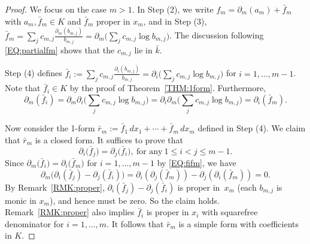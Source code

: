 \documentclass{amsart}
\theoremstyle{definition}
\numberwithin{equation}{section}
\numberwithin{thm}{section}
\begin{document}
\begin{proof} We focus on the case $m > 1$.  In Step (2), we write $f_m = \partial_m(a_m) + \bar f_m$ with $a_m, \bar{f}_m \in K$ and $\bar{f}_m$  proper in $x_m$, and in Step (3), $\bar{f}_m = \sum_j c_{m, j} \frac{\partial_m(b_{m, j})}{b_{m,j}} = \partial_m\big(\sum_j c_{m, j} \log b_{m, j}\big)$.
The discussion following \eqref{EQ:partialfm} shows that the $c_{m,j}$ lie in $\bar k$.  

Step (4) defines $\bar f_i := \sum_j c_{m, j} \frac{\partial_i(b_{m, j})}{b_{m,j}} = \partial_i\big(\sum_j c_{m, j} \log b_{m, j}\big)$ for $i = 1,\ldots,m-1$.  Note that $\bar f_i \in K$ by the proof of Theorem~\ref{THM:1form}. Furthermore,
\begin{equation}\label{EQ:fifm}
\partial_m(\bar f_i) = \partial_m\partial_i\big({\textstyle\sum_j} c_{m, j} \log b_{m, j}\big) = \partial_i\partial_m\big({\textstyle\sum_j} c_{m, j} \log b_{m, j} \big) = \partial_i(\bar f_m).
\end{equation}

Now consider the 1-form $\bar{r}_m := \bar{f}_1 \, dx_1 + \cdots + \bar{f}_m \, dx_m$
defined in Step (4). We claim that $\bar r_m$ is a closed form.  It suffices to prove that  
\[
    \partial_i\bigl(\bar{f}_j\bigr) = \partial_j\bigl(\bar{f}_i\bigr), \ \text{for any}\ 1 \leq i < j \leq m-1.
\]
Since $\partial_m\bigl(\bar{f}_i\bigr) = \partial_i\bigl(\bar{f}_m\bigr)$ for $i = 1,\ldots,m-1$ by \eqref{EQ:fifm}, we have
\[
    \partial_m \bigl(\partial_i(\bar{f}_j)-\partial_j(\bar{f}_i)\bigr) = \partial_i(\partial_j(\bar{f}_m))-\partial_j(\partial_i(\bar{f}_m)) = 0.
\]
By Remark~\ref{RMK:proper}, $\partial_i(\bar{f}_j)-\partial_j(\bar{f}_i)$ is proper in~$x_m$ (each $b_{m,j}$ is monic in $x_m$), and hence must be zero. So the claim holds.   Remark~\ref{RMK:proper} also implies $\bar f_i$ is proper in $x_i$ with squarefree denominator for $i = 1,\dots,m$.  It follows that $\bar{r}_m$ is a simple form with coefficients in $K$.


\end{proof}
\end{document}
